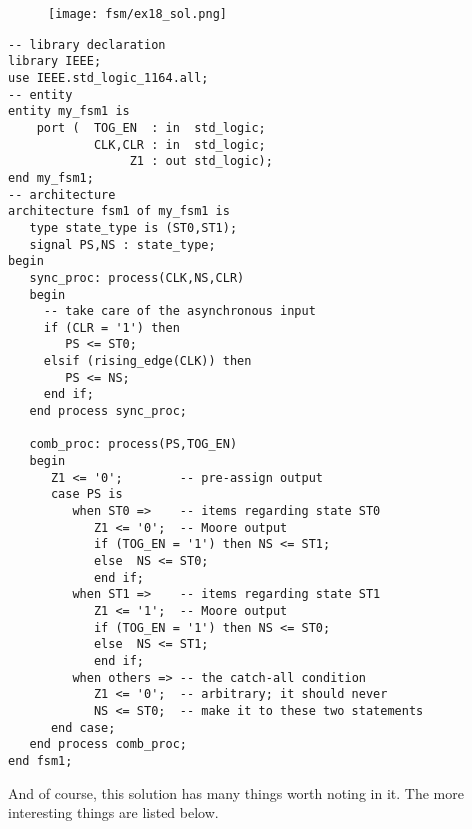 \begin{figure}[!h]
    \centering
	\texttt{[image: fsm/ex18\_sol.png]}
\end{figure}

\noindent
\begin{minipage}{0.99\linewidth}
\begin{lstlisting}[label=exe_18_code, caption=Solution to Example~18.]
-- library declaration
library IEEE;
use IEEE.std_logic_1164.all;
-- entity
entity my_fsm1 is
    port (  TOG_EN  : in  std_logic;
            CLK,CLR : in  std_logic;
                 Z1 : out std_logic);
end my_fsm1;
-- architecture
architecture fsm1 of my_fsm1 is
   type state_type is (ST0,ST1);
   signal PS,NS : state_type;
begin
   sync_proc: process(CLK,NS,CLR)
   begin
     -- take care of the asynchronous input
     if (CLR = '1') then
        PS <= ST0;
     elsif (rising_edge(CLK)) then
        PS <= NS;
     end if;
   end process sync_proc;

   comb_proc: process(PS,TOG_EN)
   begin
      Z1 <= '0';        -- pre-assign output
      case PS is
         when ST0 =>    -- items regarding state ST0
            Z1 <= '0';  -- Moore output
            if (TOG_EN = '1') then NS <= ST1;
            else  NS <= ST0;
            end if;
         when ST1 =>    -- items regarding state ST1
            Z1 <= '1';  -- Moore output
            if (TOG_EN = '1') then NS <= ST0;
            else  NS <= ST1;
            end if;
         when others => -- the catch-all condition
            Z1 <= '0';  -- arbitrary; it should never
            NS <= ST0;  -- make it to these two statements
      end case;
   end process comb_proc;
end fsm1;
\end{lstlisting}
\end{minipage}

And of course, this solution has many things worth noting in it. The more interesting things are listed below.

